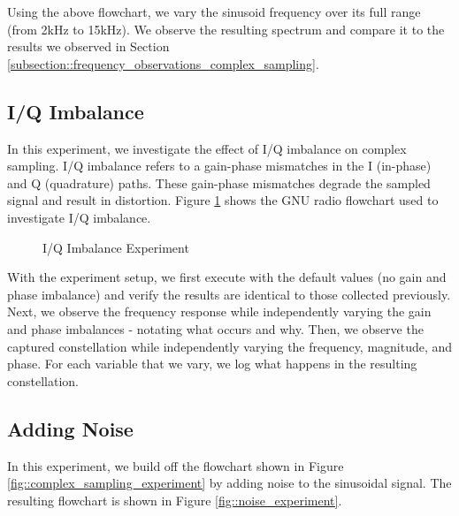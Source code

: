 \documentclass{article}
\begin{document}
Using the above flowchart, we vary the sinusoid frequency over its full range (from 2kHz to 15kHz). We observe the resulting spectrum and compare it to the results we observed in Section \ref{subsection::frequency_observations_complex_sampling}.

\subsection{I/Q Imbalance}

In this experiment, we investigate the effect of I/Q imbalance on complex sampling. I/Q imbalance refers to a gain-phase mismatches in the I (in-phase) and Q (quadrature) paths. These gain-phase mismatches degrade the sampled signal and result in distortion. Figure \ref{fig::iq_imbalance_experiment} shows the GNU radio flowchart used to investigate I/Q imbalance.

\begin{figure}[H]
	\centerline{}
	\caption{I/Q Imbalance Experiment}
	\label{fig::iq_imbalance_experiment}
\end{figure}

With the experiment setup, we first execute with the default values (no gain and phase imbalance) and verify the results are identical to those collected previously. Next, we observe the frequency response while independently varying the gain and phase imbalances - notating what occurs and why. Then, we observe the captured constellation while independently varying the frequency, magnitude, and phase. For each variable that we vary, we log what happens in the resulting constellation.  

\subsection{Adding Noise}

In this experiment, we build off the flowchart shown in Figure \ref{fig::complex_sampling_experiment} by adding noise to the sinusoidal signal. The resulting flowchart is shown in Figure \ref{fig::noise_experiment}.
\end{document}

